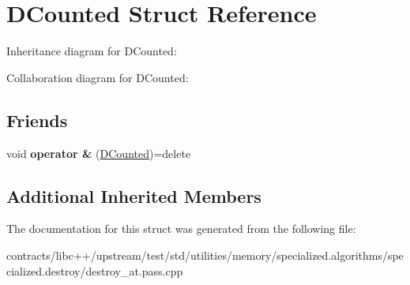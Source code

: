 \hypertarget{struct_d_counted}{}\section{D\+Counted Struct Reference}
\label{struct_d_counted}


Inheritance diagram for D\+Counted\+:


Collaboration diagram for D\+Counted\+:
\subsection*{Friends}
\begin{DoxyCompactItemize}
\item 
\mbox{\label{struct_d_counted_a4969620f8dfa7511dbe15f430401d367}} 
void {\bfseries operator \&} (\mbox{\hyperlink{struct_d_counted}{D\+Counted}})=delete
\end{DoxyCompactItemize}
\subsection*{Additional Inherited Members}


The documentation for this struct was generated from the following file\+:\begin{DoxyCompactItemize}
\item 
contracts/libc++/upstream/test/std/utilities/memory/specialized.\+algorithms/specialized.\+destroy/destroy\+\_\+at.\+pass.\+cpp\end{DoxyCompactItemize}
